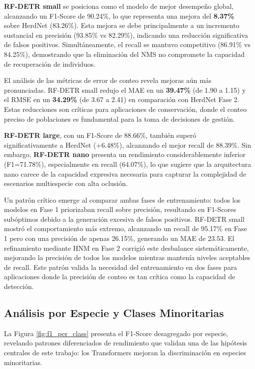 \textbf{RF-DETR small} se posiciona como el modelo de mejor desempeño global, alcanzando un F1-Score de 90.24\%, lo que representa una mejora del \textbf{8.37\%} sobre HerdNet (83.26\%). Esta mejora se debe principalmente a un incremento sustancial en precisión (93.85\% vs 82.29\%), indicando una reducción significativa de falsos positivos. Simultáneamente, el recall se mantuvo competitivo (86.91\% vs 84.25\%), demostrando que la eliminación del NMS no compromete la capacidad de recuperación de individuos.

El análisis de las métricas de error de conteo revela mejoras aún más pronunciadas. RF-DETR small redujo el MAE en un \textbf{39.47\%} (de 1.90 a 1.15) y el RMSE en un \textbf{34.29\%} (de 3.67 a 2.41) en comparación con HerdNet Fase 2. Estas reducciones son críticas para aplicaciones de conservación, donde el conteo preciso de poblaciones es fundamental para la toma de decisiones de gestión.

\textbf{RF-DETR large}, con un F1-Score de 88.66\%, también superó significativamente a HerdNet (+6.48\%), alcanzando el mejor recall de 88.39\%. Sin embargo, \textbf{RF-DETR nano} presenta un rendimiento considerablemente inferior (F1=71.78\%), especialmente en recall (64.07\%), lo que sugiere que la arquitectura nano carece de la capacidad expresiva necesaria para capturar la complejidad de escenarios multiespecie con alta oclusión.

Un patrón crítico emerge al comparar ambas fases de entrenamiento: todos los modelos en Fase 1 priorizaban recall sobre precisión, resultando en F1-Scores subóptimos debido a la generación excesiva de falsos positivos. RF-DETR small mostró el comportamiento más extremo, alcanzando un recall de 95.17\% en Fase 1 pero con una precisión de apenas 26.15\%, generando un MAE de 23.53. El refinamiento mediante HNM en Fase 2 corrigió este desbalance sistemáticamente, mejorando la precisión de todos los modelos mientras mantenía niveles aceptables de recall. Este patrón valida la necesidad del entrenamiento en dos fases para aplicaciones donde la precisión de conteo es tan crítica como la capacidad de detección.

\subsection{Análisis por Especie y Clases Minoritarias}

La Figura \ref{fig:f1_per_class} presenta el F1-Score desagregado por especie, revelando patrones diferenciados de rendimiento que validan una de las hipótesis centrales de este trabajo: los Transformers mejoran la discriminación en especies minoritarias.

